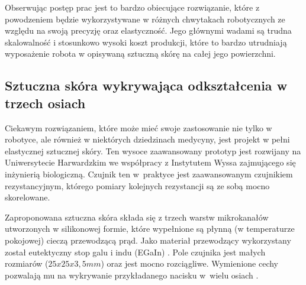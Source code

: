 Obserwując postęp prac jest to bardzo obiecujące rozwiązanie, które z powodzeniem będzie wykorzystywane w różnych chwytakach robotycznych ze względu na swoją precyzję oraz elastyczność. Jego głównymi wadami są trudna skalowalność i stosunkowo wysoki koszt produkcji, które to bardzo utrudniają wyposażenie robota w opisywaną sztuczną skórę na całej jego powierzchni.




\subsection{Sztuczna skóra wykrywająca odkształcenia w trzech osiach}


Ciekawym rozwiązaniem, które może mieć swoje zastosowanie nie tylko w robotyce, ale również w niektórych dziedzinach medycyny, jest projekt w pełni elastycznej sztucznej skóry. Ten wysoce zaawansowany prototyp jest rozwijany na Uniwersytecie Harwardzkim we współpracy z Instytutem Wyssa zajmującego się inżynierią biologiczną. Czujnik ten w~praktyce jest zaawansowanym czujnikiem rezystancyjnym, którego pomiary kolejnych rezystancji są ze sobą mocno skorelowane. 

Zaproponowana sztuczna skóra składa się z trzech warstw mikrokanałów utworzonych w silikonowej formie, które wypełnione są płynną (w temperaturze pokojowej) cieczą przewodzącą prąd. Jako materiał przewodzący wykorzystany został eutektyczny stop galu i indu (EGaIn) \cite{b_article_EGaIn}. Pole czujnika jest małych rozmiarów ($25x25x3,5mm$) oraz jest mocno rozciągliwe. Wymienione cechy pozwalają mu na wykrywanie przykładanego nacisku w~wielu osiach \cite{b_article_tactile_precise}.

